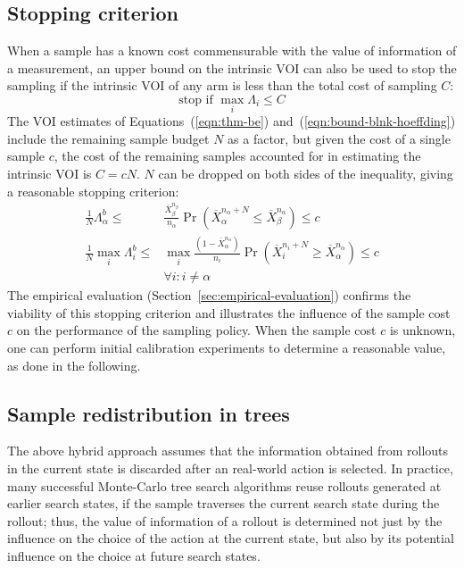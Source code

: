 \documentclass[]{article}
\newcommand{\secref}[1]{Section~\ref{#1}}
\newcommand{\eqrefs}[2]{Equations~(\ref{#1}) and~(\ref{#2})}
\begin{document}
\subsection{Stopping criterion}
\label{sec:control-stopping-criterion}

When a sample has a known cost commensurable with the value of
information of a measurement, an upper bound on the intrinsic VOI can also
be used to stop the sampling if the intrinsic VOI of any arm
is less than the total cost of sampling $C$:
\begin{equation}
\mbox{stop if } \max_i \Lambda_i \le C
\end{equation}
The VOI estimates of \eqrefs{eqn:thm-be}{eqn:bound-blnk-hoeffding} 
include the remaining sample budget $N$ as a
factor, but given the cost of a single sample $c$, the cost of the
remaining samples accounted for in estimating the intrinsic VOI is
$C=cN$. $N$ can be dropped on both sides of the inequality,
giving a reasonable stopping criterion:
\begin{align}
\frac 1 N \Lambda_\alpha^b \le&\frac {\overline X_\beta^{n_\beta}}
  {n_\alpha}\Pr(\overline X_\alpha^{n_\alpha+N}\le\overline
  X_\beta^{n_\alpha})\le c\nonumber\\
\frac 1 N \max_i\Lambda_i^b\le &\max_i\frac {(1-\overline X_\alpha^{n_\alpha})} {n_i}\Pr(\overline
  X_i^{n_i+N}\ge\overline X_\alpha^{n_\alpha})\le c\nonumber\\
    &\forall i: i\ne\alpha
\label{eqn:stopping-blnk}
\end{align}
The empirical evaluation (\secref{sec:empirical-evaluation})
confirms the viability of this stopping criterion and illustrates the
influence of the sample cost $c$ on the performance of
the sampling policy. When the sample cost $c$ is unknown, one can perform initial calibration experiments
to determine a reasonable value, as done in the following.

\subsection{Sample redistribution in trees}
\label{sec:control-redistribution}

The above hybrid approach assumes
that the information obtained from rollouts in the
current state is discarded after an real-world action is selected. In practice,
many successful Monte-Carlo tree search algorithms reuse rollouts
generated at earlier search states, if the sample traverses the
current search state during the rollout; thus, the value of information of a rollout is
determined not just by the influence on the choice of the action at
the current state, but also by its potential influence on the choice at future
search states.
\end{document}
